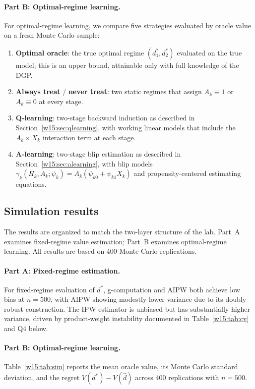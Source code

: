 \documentclass[master.tex]{subfiles}
\begin{document}
\paragraph{Part B: Optimal-regime learning.}
For optimal-regime learning, we compare five strategies evaluated by oracle value on a fresh Monte Carlo sample:
\begin{enumerate}
  \item \textbf{Optimal oracle}: the true optimal regime
        $(d_1^*, d_2^*)$ evaluated on the true model; this is an
        upper bound, attainable only with full knowledge of the DGP.
  \item \textbf{Always treat} / \textbf{never treat}: two static regimes
        that assign $A_k \equiv 1$ or $A_k \equiv 0$ at every stage.
  \item \textbf{Q-learning}: two-stage backward induction as described in
        Section~\ref{w15:sec:qlearning}, with working linear models that
        include the $A_k \times X_k$ interaction term at each stage.
  \item \textbf{A-learning}: two-stage blip estimation as described in
        Section~\ref{w15:sec:alearning}, with blip models
        $\gamma_k(H_k, A_k;\psi_k) = A_k(\psi_{k0} + \psi_{k1}X_k)$
        and propensity-centered estimating equations.
\end{enumerate}

\subsection{Simulation results}
\label{w15:sec:lab:results}

The results are organized to match the two-layer structure of the lab. Part~A examines fixed-regime value estimation; Part~B examines optimal-regime learning. All results are based on 400 Monte Carlo replications.

\paragraph{Part A: Fixed-regime estimation.}
For fixed-regime evaluation of $d^*$, g-computation and AIPW both achieve low bias at $n = 500$, with AIPW showing modestly lower variance due to its doubly robust construction. The IPW estimator is unbiased but has substantially higher variance, driven by product-weight instability documented in Table~\ref{w15:tab:cv} and Q4 below.

\paragraph{Part B: Optimal-regime learning.}
Table~\ref{w15:tab:sim} reports the mean oracle value, its Monte Carlo
standard deviation, and the regret $V(d^*) - V(\hat d)$ across 400
replications with $n = 500$.
\end{document}
